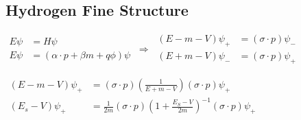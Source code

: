 \documentclass[12pt]{article}
\begin{document}
\subsection{Hydrogen Fine Structure}
\(
    \begin{aligned}
        E \psi & = H \psi\\
        E \psi & = (\alpha \cdot p + \beta m + q\phi) \psi
    \end{aligned}
    \ \Rightarrow\ 
    \begin{aligned}
        ( E - m - V ) \psi_+ & = ( \sigma \cdot p ) \psi_-\\
        ( E + m - V ) \psi_- & = ( \sigma \cdot p ) \psi_+
    \end{aligned}            
\)

\vspace{15pt}\noindent
\begin{minipage}[t]{.65\textwidth}
    \(
        \begin{aligned}
            ( E - m - V ) \psi_+ & = ( \sigma \cdot p ) \left( \tfrac{1}{E + m - V } \right) ( \sigma \cdot p ) \psi_+\\
            ( E_s - V ) \psi_+ & = \tfrac{1}{2m} ( \sigma \cdot p ) 
                \left( 1 + \tfrac{E_S - V}{2m} \right)^{-1} 
                ( \sigma \cdot p ) \psi_+
                \\[5pt]                
        \end{aligned}
    \)


\end{minipage}
\end{document}
